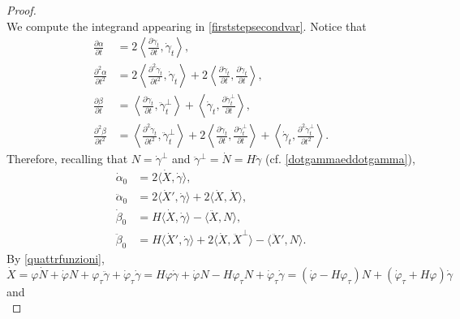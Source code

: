 \documentclass[11pt]{amsart}
\theoremstyle{definition}
\theoremstyle{remark}
\numberwithin{equation}{section}
\begin{document}
\begin{proof}
\begin{equation}
\end{equation}
We compute the integrand appearing in \eqref{firststepsecondvar}. Notice that 
\begin{align*}
	\frac{\partial\alpha}{\partial t}&=2\left\langle\frac{\partial \dot\gamma_t}{\partial t},\dot\gamma_t\right\rangle,\\
	\frac{\partial^2\alpha}{\partial t^2}&=2\left\langle\frac{\partial^2\dot\gamma_t}{\partial t^2},\dot\gamma_t\right\rangle+2\left\langle\frac{\partial \dot\gamma_t}{\partial t},\frac{\partial \dot\gamma_t}{\partial t}\right\rangle,\\
	\frac{\partial\beta}{\partial t}&=\left\langle\frac{\partial \dot\gamma_t}{\partial t},\ddot\gamma_t^\perp\right\rangle+\left\langle\dot\gamma_t,\frac{\partial\ddot\gamma_t^\perp}{\partial t}\right\rangle,\\
	\frac{\partial^2\beta}{\partial t^2}&=\left\langle\frac{\partial^2 \dot\gamma_t}{\partial t^2},\ddot\gamma_t^\perp\right\rangle+2\left\langle\frac{\partial \dot\gamma_t}{\partial t},\frac{\partial\ddot\gamma_t^\perp}{\partial t}\right\rangle+\left\langle\dot\gamma_t,\frac{\partial^2\ddot\gamma_t^\perp}{\partial t^2}\right\rangle.
\end{align*}
Therefore, recalling that $N=\dot\gamma^\perp$ and $\ddot\gamma^\perp=\dot N=H\dot\gamma$ (cf. \eqref{dotgammaeddotgamma}),
\begin{equation}\label{eq:sec2}
	\begin{split}
		\dot\alpha_0&=2\big\langle\dot X,\dot\gamma\big\rangle,\\
		\ddot\alpha_0&=2\big\langle\dot X',\dot\gamma\big\rangle+2\big\langle\dot X,\dot X\big\rangle,\\
		\dot \beta_0&=H\big\langle\dot X,\dot\gamma\big\rangle-\big\langle\ddot X,N\big\rangle,\\
		\ddot\beta_0&=H\big\langle\dot X',\dot\gamma\big\rangle+2\big\langle\dot X,\ddot X^\perp\big\rangle-\big\langle\ddot X',N\big\rangle.
	\end{split}
\end{equation}
By \eqref{quattrfunzioni},
\begin{equation}\label{dotxexprinproof}
	\dot X=\varphi\dot N+\dot\varphi N+\varphi_\tau\ddot\gamma+\dot\varphi_\tau\dot\gamma=H\varphi\dot\gamma+\dot\varphi N-H\varphi_\tau N+\dot\varphi_\tau\dot\gamma=\left(\dot\varphi-H\varphi_\tau\right)N+\left(\dot\varphi_\tau+H\varphi\right)\dot\gamma
\end{equation}
and
\begin{equation}\label{eq:sec3}

\end{equation}
\end{proof}
\end{document}
